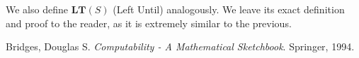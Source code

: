 \documentclass{article}
\newcommand{\LT}{\mathbf{LT}}
\begin{document}
	We also define $\LT(S)$ (Left Until) analogously. We leave its exact definition and proof to the reader, as it is extremely similar to the previous.
	
\begin{thebibliography}{9}
Bridges, Douglas S.
\textit{Computability - A Mathematical Sketchbook}. 
Springer, 1994. %
\end{thebibliography}	
\end{document}
